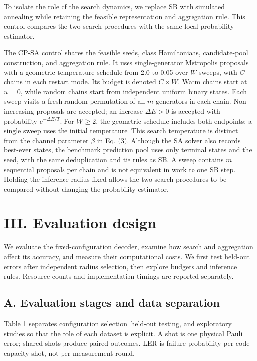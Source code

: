 \documentclass[
  10pt,
]{article}
\begin{document}
To isolate the role of the search dynamics, we replace SB with simulated
annealing while retaining the feasible representation and aggregation
rule. This control compares the two search procedures with the same
local probability estimator.

The CP-SA control shares the feasible seeds, class Hamiltonians,
candidate-pool construction, and aggregation rule. It uses
single-generator Metropolis proposals with a geometric temperature
schedule from 2.0 to 0.05 over \(W\) sweeps, with \(C\) chains in each
restart mode. Its budget is denoted \(C\times W\). Warm chains start at
\(u=0\), while random chains start from independent uniform binary
states. Each sweep visits a fresh random permutation of all \(m\)
generators in each chain. Non-increasing proposals are accepted; an
increase \(\Delta E>0\) is accepted with probability
\(e^{-\Delta E/T}\). For \(W\ge2\), the geometric schedule includes both
endpoints; a single sweep uses the initial temperature. This search
temperature is distinct from the channel parameter \(\beta\) in Eq. (3).
Although the SA solver also records best-ever states, the benchmark
prediction pool uses only terminal states and the seed, with the same
deduplication and tie rules as SB. A sweep contains \(m\) sequential
proposals per chain and is not equivalent in work to one SB step.
Holding the inference radius fixed allows the two search procedures to
be compared without changing the probability estimator.

\section{III. Evaluation design}\label{iii.-evaluation-design}

We evaluate the fixed-configuration decoder, examine how search and
aggregation affect its accuracy, and measure their computational costs.
We first test held-out errors after independent radius selection, then
explore budgets and inference rules. Resource counts and implementation
timings are reported separately.

\subsection{A. Evaluation stages and data
separation}\label{a.-evaluation-stages-and-data-separation}

\hyperref[tab:1]{Table 1} separates configuration selection, held-out testing, and
exploratory studies so that the role of each dataset is explicit. A shot
is one physical Pauli error; shared shots produce paired outcomes. LER
is failure probability per code-capacity shot, not per measurement
round.
\end{document}
